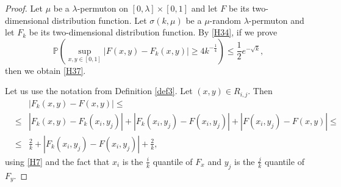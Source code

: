 \documentclass[12pt,twoside]{article}
\theoremstyle{definition}
\theoremstyle{remark}
\numberwithin{equation}{section}
\theoremstyle{plain}
\theoremstyle{remark}
\def\P{{\mathbb {P}}}                       \def\Q{{\mathbb {Q}}}
\begin{document}
\begin{proof}
Let $\mu$ be a $\lambda$-permuton on $[0,\lambda] \times [0,1]$ and let 
$F$ be its two-dimensional distribution function.
Let $\sigma(k, \mu)$ be a $\mu$-random $\lambda$-permuton and let $F_k$ be its 
two-dimensional distribution function.
By \eqref{H34}, if we prove
\begin{equation} \label{H39}
\P \left( \sup_{x,y\in[0,1]} |F(x,y) -F_k(x,y)| \ge 4 k^{-\frac{1}{4}}   \right)
\le \frac{1}{2} e^{-\sqrt{k}},
\end{equation}
then we obtain \eqref{H37}.

Let us use the notation from Definition \ref{def3}.
Let $(x,y)\in R_{i,j}$.
Then
\begin{eqnarray} \label{H18}
&&| F_k(x,y)- F(x,y) |\le \\
&\le & | F_k(x,y)- F_k(x_i,y_j) |+ | F_k(x_i,y_j)- F(x_i,y_j) | +| F(x_i,y_j)- F(x,y) |\le  \nonumber \\
&\le & \frac{2}{k}+ | F_k(x_i,y_j)- F(x_i,y_j) | + \frac{2}{k}, \nonumber
\end{eqnarray}
using \eqref{H7} and the fact that $x_i$ is the $\frac{i}{k}$ quantile of $F_x$ and $y_j$ is the $\frac{j}{k}$ quantile of $F_y$.


\end{proof}
\end{document}
